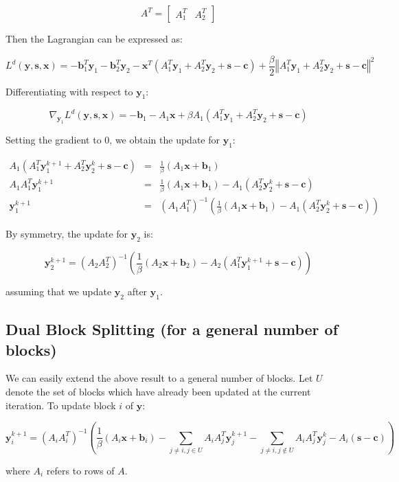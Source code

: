 \documentclass{article}
\begin{document}
\[
A^{T}=\begin{bmatrix}A_{1}^{T} & A_{2}^{T}\end{bmatrix}
\]


Then the Lagrangian can be expressed as:

\[
L^{d}(\mathbf{y},\mathbf{s},\mathbf{x})=-\mathbf{b}_{1}^{T}\mathbf{y}_{1}-\mathbf{b}_{2}^{T}\mathbf{y}_{2}-\mathbf{x}^{T}\left(A_{1}^{T}\mathbf{y}_{1}+A_{2}^{T}\mathbf{y}_{2}+\mathbf{s}-\mathbf{c}\right)+\frac{\beta}{2}\left\Vert A_{1}^{T}\mathbf{y}_{1}+A_{2}^{T}\mathbf{y}_{2}+\mathbf{s}-\mathbf{c}\right\Vert ^{2}
\]


Differentiating with respect to $\mathbf{y}_{1}$:

\[
\nabla_{\mathbf{y}_{1}}L^{d}(\mathbf{y},\mathbf{s},\mathbf{x})=-\mathbf{b}_{1}-A_{1}\mathbf{x}+\beta A_{1}\left(A_{1}^{T}\mathbf{y}_{1}+A_{2}^{T}\mathbf{y}_{2}+\mathbf{s}-\mathbf{c}\right)
\]


Setting the gradient to 0, we obtain the update for $\mathbf{y}_{1}$:

\begin{eqnarray*}
A_{1}\left(A_{1}^{T}\mathbf{y}_{1}^{k+1}+A_{2}^{T}\mathbf{y}_{2}^{k}+\mathbf{s}-\mathbf{c}\right) & = & \frac{1}{\beta}\left(A_{1}\mathbf{x}+\mathbf{b}_{1}\right)\\
A_{1}A_{1}^{T}\mathbf{y}_{1}^{k+1} & = & \frac{1}{\beta}\left(A_{1}\mathbf{x}+\mathbf{b}_{1}\right)-A_{1}\left(A_{2}^{T}\mathbf{y}_{2}^{k}+\mathbf{s}-\mathbf{c}\right)\\
\mathbf{y}_{1}^{k+1} & = & \left(A_{1}A_{1}^{T}\right)^{-1}\left(\frac{1}{\beta}\left(A_{1}\mathbf{x}+\mathbf{b}_{1}\right)-A_{1}\left(A_{2}^{T}\mathbf{y}_{2}^{k}+\mathbf{s}-\mathbf{c}\right)\right)
\end{eqnarray*}


By symmetry, the update for $\mathbf{y}_{2}$ is:

\[
\mathbf{y}_{2}^{k+1}=\left(A_{2}A_{2}^{T}\right)^{-1}\left(\frac{1}{\beta}\left(A_{2}\mathbf{x}+\mathbf{b}_{2}\right)-A_{2}\left(A_{1}^{T}\mathbf{y}_{1}^{k+1}+\mathbf{s}-\mathbf{c}\right)\right)
\]


assuming that we update $\mathbf{y}_{2}$ after $\mathbf{y}_{1}$.


\subsection*{Dual Block Splitting (for a general number of blocks)}

We can easily extend the above result to a general number of blocks.
Let $U$ denote the set of blocks which have already been updated
at the current iteration. To update block $i$ of $\mathbf{y}$:

\[
\mathbf{y}_{i}^{k+1}=\left(A_{i}A_{i}^{T}\right)^{-1}\left(\frac{1}{\beta}\left(A_{i}\mathbf{x}+\mathbf{b}_{i}\right)-\sum_{j\neq i,j\in U}A_{i}A_{j}^{T}\mathbf{y}_{j}^{k+1}-\sum_{j\neq i,j\notin U}A_{i}A_{j}^{T}\mathbf{y}_{j}^{k}-A_{i}\left(\mathbf{s}-\mathbf{c}\right)\right)
\]


where $A_{i}$ refers to rows of $A$.
\newpage
\vspace{0.4in}
%

\end{document}
